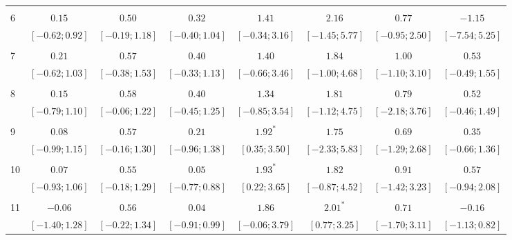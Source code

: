 \documentclass[12pt]{amsart}
\begin{document}
\begin{table}
{\begin{tabular}{l c c c c c c c}
   &       &       &       &       &       &       &       \\
6  & $0.15$           & $0.50$           & $0.32$           & $1.41$           & $2.16$           & $0.77$           & $-1.15$           \\
   & $ [-0.62; 0.92]$ & $ [-0.19; 1.18]$ & $ [-0.40; 1.04]$ & $ [-0.34; 3.16]$ & $ [-1.45; 5.77]$ & $ [-0.95; 2.50]$ & $ [ -7.54; 5.25]$ \\
   &       &       &       &       &       &       &       \\
7  & $0.21$           & $0.57$           & $0.40$           & $1.40$           & $1.84$           & $1.00$           & $0.53$            \\
   & $ [-0.62; 1.03]$ & $ [-0.38; 1.53]$ & $ [-0.33; 1.13]$ & $ [-0.66; 3.46]$ & $ [-1.00; 4.68]$ & $ [-1.10; 3.10]$ & $ [ -0.49; 1.55]$ \\
   &       &       &       &       &       &       &       \\
8  & $0.15$           & $0.58$           & $0.40$           & $1.34$           & $1.81$           & $0.79$           & $0.52$            \\
   & $ [-0.79; 1.10]$ & $ [-0.06; 1.22]$ & $ [-0.45; 1.25]$ & $ [-0.85; 3.54]$ & $ [-1.12; 4.75]$ & $ [-2.18; 3.76]$ & $ [ -0.46; 1.49]$ \\
   &       &       &       &       &       &       &       \\
9  & $0.08$           & $0.57$           & $0.21$           & $1.92^{*}$       & $1.75$           & $0.69$           & $0.35$            \\
   & $ [-0.99; 1.15]$ & $ [-0.16; 1.30]$ & $ [-0.96; 1.38]$ & $ [ 0.35; 3.50]$ & $ [-2.33; 5.83]$ & $ [-1.29; 2.68]$ & $ [ -0.66; 1.36]$ \\
   &       &       &       &       &       &       &       \\
10 & $0.07$           & $0.55$           & $0.05$           & $1.93^{*}$       & $1.82$           & $0.91$           & $0.57$            \\
   & $ [-0.93; 1.06]$ & $ [-0.18; 1.29]$ & $ [-0.77; 0.88]$ & $ [ 0.22; 3.65]$ & $ [-0.87; 4.52]$ & $ [-1.42; 3.23]$ & $ [ -0.94; 2.08]$ \\
   &       &       &       &       &       &       &       \\
11 & $-0.06$          & $0.56$           & $0.04$           & $1.86$           & $2.01^{*}$       & $0.71$           & $-0.16$           \\
   & $ [-1.40; 1.28]$ & $ [-0.22; 1.34]$ & $ [-0.91; 0.99]$ & $ [-0.06; 3.79]$ & $ [ 0.77; 3.25]$ & $ [-1.70; 3.11]$ & $ [ -1.13; 0.82]$ \\

\end{tabular}}
\end{table}
\end{document}
